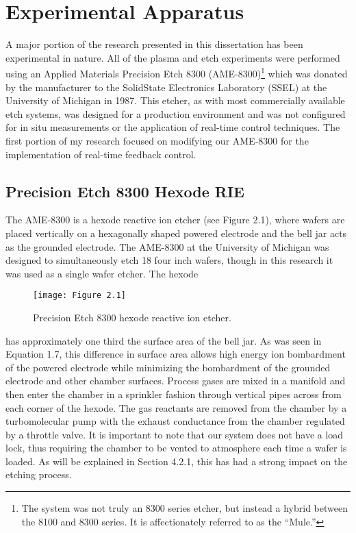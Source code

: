 \chapter{Experimental Apparatus}

\tab A major portion of the research presented in this dissertation has been experimental in nature. All of the plasma and etch experiments were performed using an Applied Materials Precision Etch 8300 (AME-8300)\footnote{The system was not truly an 8300 series etcher, but instead a hybrid between the 8100 and 8300 series. It is affectionately referred to as the “Mule.”} which was donated by the manufacturer to the SolidState Electronics Laboratory (SSEL) at the University of Michigan in 1987. This etcher, as with most commercially available etch systems, was designed for a production environment and was not configured for in situ measurements or the application of real-time control techniques. The first portion of my research focused on modifying our AME-8300 for the implementation of real-time feedback control.

\section{Precision Etch 8300 Hexode RIE}

\tab The AME-8300 is a hexode reactive ion etcher (see Figure 2.1), where wafers are placed vertically on a hexagonally shaped powered electrode and the bell jar acts as the grounded electrode. The AME-8300 at the University of Michigan was designed to simultaneously etch 18 four inch wafers, though in this research it was used as a single wafer etcher. The hexode


\begin{figure}[H]
	\centering
	\texttt{[image: Figure 2.1]}
	\bf\caption{ Precision Etch 8300 hexode reactive ion etcher.}
	\label{fig:2.1}
\end{figure}

\noindent has approximately one third the surface area of the bell jar. As was seen in Equation 1.7, this difference in surface area allows high energy ion bombardment of the powered electrode while minimizing the bombardment of the grounded electrode and other chamber surfaces. Process gases are mixed in a manifold and then enter the chamber in a sprinkler fashion through vertical pipes across from each corner of the hexode. The gas reactants are
removed from the chamber by a turbomolecular pump with the exhaust conductance from the chamber regulated by a throttle valve. It is important to note that our system does not
have a load lock, thus requiring the chamber to be vented to atmosphere each time a wafer is loaded. As will be explained in Section 4.2.1, this has had a strong impact on the etching
process.

